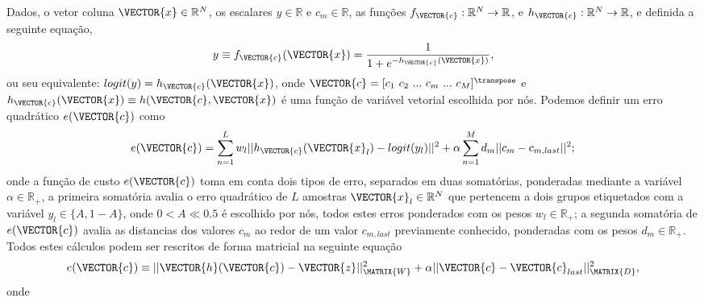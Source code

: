 
\begin{myproofT}\label{proof:theo:reglogrnr1nolinear}
Dados,
o vetor coluna $\VECTOR{x} \in \mathbb{R}^{N}$, os escalares $y \in \mathbb{R}$ e $c_m \in \mathbb{R}$,
as funções $f_{\VECTOR{c}}:\mathbb{R}^{N} \rightarrow \mathbb{R}$, 
e $h_{\VECTOR{c}}:\mathbb{R}^{N} \rightarrow \mathbb{R}$,  e 
definida a seguinte equação,
\begin{equation}\label{eq:proof:theo:reglogrnr1nolinear:1}
y\equiv f_{\VECTOR{c}}(\VECTOR{x})= \frac{1}{1+e^{-h_{\VECTOR{c}}(\VECTOR{x}) }},
\end{equation}
ou seu equivalente: $logit(y)=h_{\VECTOR{c}}(\VECTOR{x})$,
onde $\VECTOR{c}=[c_1~ c_2~ ...~ c_m~ ...~ c_{M}]^{\transpose}$ e
$h_{\VECTOR{c}}(\VECTOR{x})\equiv h(\VECTOR{c},\VECTOR{x})$ é uma função de variável vetorial escolhida por nós.
Podemos definir um erro quadrático $e(\VECTOR{c})$ como
\begin{equation}\label{eq:proof:theo:reglogrnr1nolinear:2}
e(\VECTOR{c}) =  
\sum_{n=1}^{L} w_l||h_{\VECTOR{c}}(\VECTOR{x}_l)-logit(y_l)||^2
+\alpha \sum_{n=1}^{M} d_m||c_m-c_{m,last}||^2;
\end{equation}
onde a função de custo $e(\VECTOR{c})$ toma em conta dois tipos de erro, separados em duas somatórias,
ponderadas mediante a variável $\alpha \in \mathbb{R}_+$,
a primeira somatória avalia o erro quadrático de $L$ amostras $\VECTOR{x}_l \in \mathbb{R}^{N}$ que pertencem a 
dois grupos etiquetados com a variável $y_l\in \{A,1-A\}$, 
onde $0<A\ll 0.5$ é escolhido por nós,
todos estes erros ponderados com os pesos $w_l \in \mathbb{R}_+$;
a segunda somatória de $e(\VECTOR{c})$ 
avalia as distancias dos valores $c_m$ ao redor de um valor $c_{m,last}$
previamente conhecido,
ponderadas com os pesos $d_m \in \mathbb{R}_+$.
Todos estes cálculos podem ser rescritos de forma matricial
na seguinte equação
\begin{equation}\label{eq:proof:theo:reglogrnr1nolinear:3}
e(\VECTOR{c}) \equiv ||\VECTOR{h}(\VECTOR{c})-\VECTOR{z}||_{\MATRIX{W}}^2
+ \alpha ||\VECTOR{c}-\VECTOR{c}_{last}||_{\MATRIX{D}}^2 ,
\end{equation}
onde
\begin{equation}\label{eq:proof:reglogrnr1nolinear:4}

\end{equation}
\end{myproofT}
